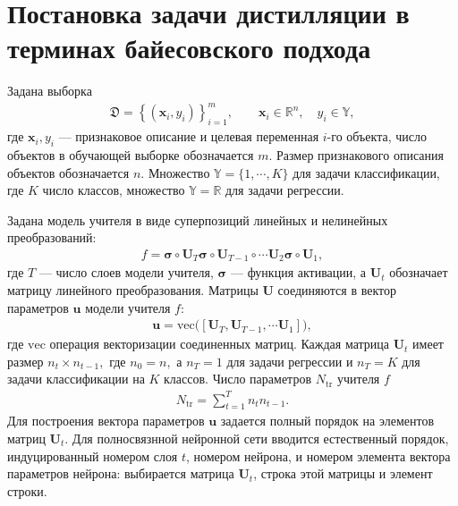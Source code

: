 \section{Постановка задачи дистилляции в терминах байесовского подхода}
Задана выборка
\[
\label{eq:st:1}
\begin{aligned}
\mathfrak{D} = \left\{\left(\mathbf{x}_i, y_i\right)\right\}_{i=1}^{m}, \qquad \mathbf{x}_i \in \mathbb{R}^{n}, \quad y_i \in \mathbb{Y},
\end{aligned}
\]
где $\mathbf{x}_i, y_i$ --- признаковое описание и целевая переменная $i$-го объекта, число объектов в обучающей выборке обозначается $m$. Размер признакового описания объектов обозначается $n$. Множество $\mathbb{Y}=\{1,\cdots,K\}$ для задачи классификации, где $K$ число классов, множество $\mathbb{Y}=\mathbb{R}$ для задачи регрессии.

Задана модель учителя в виде суперпозиций линейных и нелинейных преобразований:
\[
\label{eq:st:2}
\begin{aligned}
f = \bm{\sigma} \circ \mathbf{U}_T \bm{\sigma} \circ \mathbf{U}_{T-1}\circ \cdots  \mathbf{U}_2\bm{\sigma} \circ \mathbf{U}_1,
\end{aligned}
\]
где $T$ --- число слоев модели учителя, $\bm{\sigma}$ --- функция активации, а $\mathbf{U}_t$ обозначает матрицу линейного преобразования. Матрицы $\mathbf{U}$ соединяются в вектор параметров $\mathbf{u}$ модели учителя $f$:
\[
\label{eq:st:2.1}
\begin{aligned}
\mathbf{u} = \text{vec}\bigr(\left[\mathbf{U}_T, \mathbf{U}_{T-1}, \cdots \mathbf{U}_1\right]\bigr),
\end{aligned}
\]
где $\text{vec}$ операция векторизации соединенных матриц.
Каждая матрица $\mathbf{U}_t$ имеет размер $n_t\times n_{t-1},$ где $n_0=n,$ а  $n_T={1}$ для задачи регрессии и $n_T=K$ для задачи классификации на $K$ классов. Число параметров $N_{\text{tr}}$ учителя $f$
\[
\label{eq:st:2.2}
\begin{aligned}
N_{\text{tr}} = \sum_{t=1}^{T}n_tn_{t-1}.
\end{aligned}
\]
Для построения вектора параметров $\mathbf{u}$ задается полный порядок на элементов матриц $\mathbf{U}_t$. Для полносвязнной нейронной сети вводится естественный порядок, индуцированный номером слоя $t$, номером нейрона, и номером элемента вектора параметров нейрона: выбирается матрица $\mathbf{U}_t$, строка этой матрицы и элемент строки.

